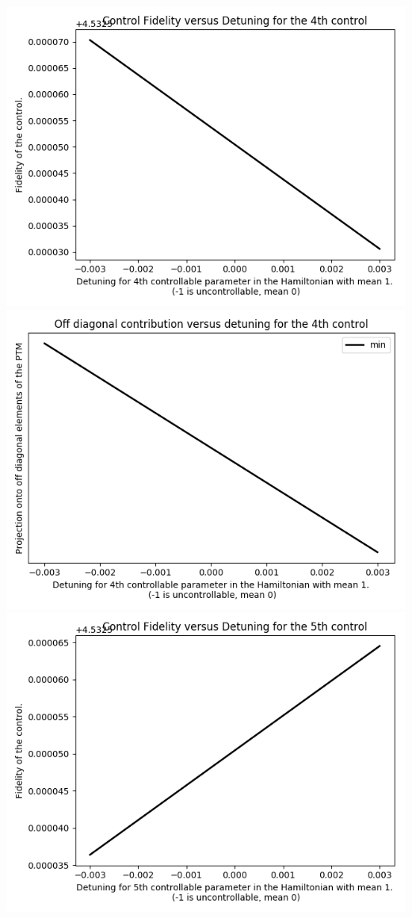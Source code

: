 \documentclass{article}
\begin{document}
\begin{center}
\includegraphics[scale=.9]{control_fid_5}
\includegraphics[scale=.9]{off_diag_5}
\includegraphics[scale=.9]{control_fid_6}

\end{center}
\end{document}

